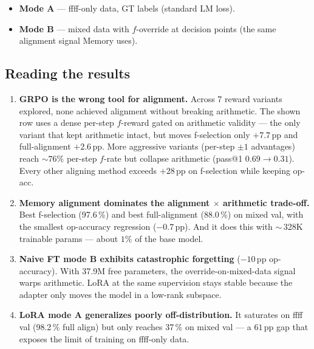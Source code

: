 \documentclass[10pt]{article}
\begin{document}
\begin{itemize}[leftmargin=1.5em, itemsep=1pt]
  \item \textbf{Mode A} --- ffff-only data, GT labels (standard LM loss).
  \item \textbf{Mode B} --- mixed data with $f$-override at decision points
    (the same alignment signal Memory uses).
\end{itemize}

\subsection*{Reading the results}

\begin{enumerate}[leftmargin=1.5em, itemsep=2pt]
  \item \textbf{GRPO is the wrong tool for alignment.} Across 7 reward
    variants explored, none achieved alignment without breaking arithmetic.
    The shown row uses a dense per-step $f$-reward gated on arithmetic
    validity --- the only variant that kept arithmetic intact, but moves
    f-selection only $+7.7$\,pp and full-alignment $+2.6$\,pp. More
    aggressive variants (per-step $\pm 1$ advantages) reach $\sim 76\%$
    per-step $f$-rate but collapse arithmetic (pass@1 $0.69\to 0.31$).
    Every other aligning method exceeds $+28$\,pp on f-selection while
    keeping op-acc.
  \item \textbf{Memory alignment dominates the alignment $\times$ arithmetic
    trade-off.} Best f-selection (97.6\,\%) and best full-alignment (88.0\,\%)
    on mixed val, with the smallest op-accuracy regression ($-0.7$\,pp). And
    it does this with $\sim$\,328K trainable params --- about $1\%$ of the
    base model.
  \item \textbf{Naive FT mode B exhibits catastrophic forgetting} ($-10$\,pp
    op-accuracy). With 37.9M free parameters, the override-on-mixed-data
    signal warps arithmetic. LoRA at the same supervision stays stable
    because the adapter only moves the model in a low-rank subspace.
  \item \textbf{LoRA mode A generalizes poorly off-distribution.} It saturates
    on ffff val (98.2\,\% full align) but only reaches 37\,\% on mixed val ---
    a $61$\,pp gap that exposes the limit of training on ffff-only data.
\end{enumerate}
\end{document}
